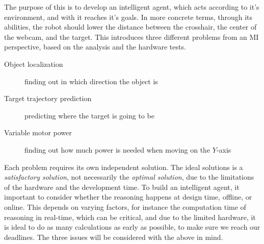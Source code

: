 The purpose of this is to develop an intelligent agent, which acts according to it's environment, and with it reaches it's goals.
In more concrete terms, through its abilities, the robot should lower the distance between the crosshair, the center of the webcam, and the target.
This introduces three different problems from an MI perspective, based on the analysis and the hardware tests.
\begin{description}
	\item[Object localization] finding out in which direction the object is
	\item[Target trajectory prediction] predicting where the target is going to be
	\item[Variable motor power] finding out how much power is needed when moving on the $Y$-axis
\end{description}


Each problem requires its own independent solution.
The ideal solutions is a \textit{satisfactory solution}, not necessarily the \textit{optimal solution}, due to the limitations of the hardware and the development time.
To build an intelligent agent, it important to consider whether the reasoning happens at design time, offline, or online.
This depends on varying factors, for instance the computation time of reasoning in real-time, which can be critical, and due to the limited hardware, it is ideal to do as many calculations as early as possible, to make sure we reach our deadlines.
The three issues will be considered with the above in mind.



